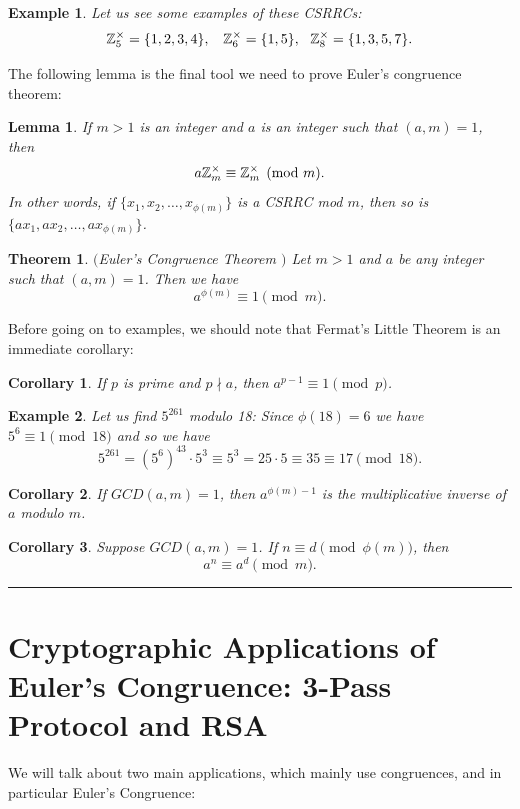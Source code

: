 \documentclass[12pt]{article}
\theoremstyle{plain}
\newtheorem{corollary}{Corollary}
\newtheorem{lemma}{Lemma}
\newtheorem{example}{Example}
\newtheorem{theorem}{Theorem}
\theoremstyle{definition}
\theoremstyle{remark}
\begin{document}
\bigskip
\begin{example}
Let us see some examples of these CSRRCs:
$$\mathbb{Z}_5^{\times} = \{1,2,3,4\}, \:\:\:\:\mathbb{Z}_6^{\times} = \{1,5\}, \:\:\: \mathbb{Z}_8^{\times} = \{1,3,5,7\}.$$
\end{example}

\bigskip
\noindent
The following lemma is the final tool we need to prove Euler's congruence theorem:
\begin{lemma}
If $m>1$ is an integer and $a$ is an integer such that $(a,m)=1$, then 
$$a\mathbb{Z}_m^{\times} \equiv \mathbb{Z}_m^{\times} \pmod{m}.$$
In other words, if $\{x_1, x_2, \dots, x_{\phi(m)}\}$ is a CSRRC mod $m$, then so is
$\{ax_1, ax_2, \dots, ax_{\phi(m)}\}$.
\end{lemma}

\bigskip
\noindent
\begin{theorem}$($Euler's Congruence Theorem $)$ \label{EulerCong}
Let $m>1$ and $a$ be any integer such that $(a,m) =1$. Then we have
$$a^{\phi(m)} \equiv 1 \pmod{m}.$$
\end{theorem}

\bigskip
\noindent
Before going on to examples, we should note that Fermat's Little Theorem is an immediate corollary:
\begin{corollary}
If $p$ is prime and $p\nmid a$, then $a^{p-1} \equiv 1\pmod{p}$.
\end{corollary}

\begin{example}
Let us find $5^{261}$ modulo 18: Since $\phi(18)=6$ we have 
$5^{6} \equiv 1 \pmod{18}$ and so we have 
$$5^{261} = (5^6)^{43} \cdot 5^3 \equiv 5^3 =25\cdot 5 \equiv 35 \equiv 17 \pmod{18}.$$
\end{example}

\bigskip
\noindent
\begin{corollary}
If $GCD(a,m)=1$, then $a^{\phi(m)-1}$ is the multiplicative inverse of $a$ modulo $m$.
\end{corollary}

\begin{corollary}
Suppose $GCD(a,m)=1$. If $n\equiv d \pmod{\phi(m)}$, then 
$$a^n \equiv a^d \pmod{m}.$$
\end{corollary}

\bigskip
\hrule

\section{Cryptographic Applications of Euler's Congruence: 3-Pass Protocol and RSA}
We will talk about two main applications, which mainly use congruences, and in particular Euler's Congruence:
\end{document}
